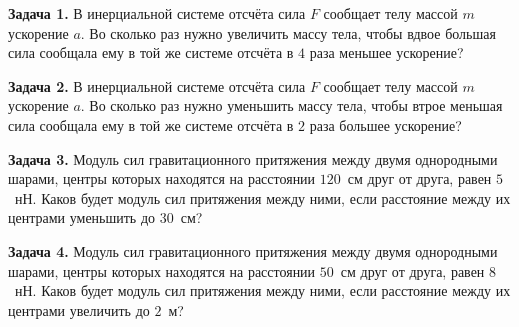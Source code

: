 
\begin{taskbasic}[code={\label{task:dem26_v1_n2}}]
\textbf{Задача 1.} В инерциальной системе отсчёта сила $F$ сообщает телу массой $m$ ускорение $a$. Во сколько раз нужно увеличить массу тела, чтобы вдвое большая сила сообщала ему в той же системе отсчёта в $4$ раза меньшее ускорение?

\end{taskbasic}

\begin{taskbasic}[code={\label{task:dem26_v2_n2}}]
\textbf{Задача 2.} В инерциальной системе отсчёта сила $F$ сообщает телу массой $m$ ускорение $a$. Во сколько раз нужно уменьшить массу тела, чтобы втрое меньшая сила сообщала ему в той же системе отсчёта в $2$ раза большее ускорение?

\end{taskbasic}

\begin{taskbasic}[code={\label{task:dem26_v3_n2}}]
\textbf{Задача 3.} Модуль сил гравитационного притяжения между двумя однородными шарами, центры которых находятся на расстоянии $120$~см друг от друга, равен $5$~нН. Каков будет модуль сил притяжения между ними, если расстояние между их центрами уменьшить до $30$~см?

\end{taskbasic}

\begin{taskbasic}[code={\label{task:dem26_v4_n2}}]
\textbf{Задача 4.} Модуль сил гравитационного притяжения между двумя однородными шарами, центры которых находятся на расстоянии $50$~см друг от друга, равен $8$~нН. Каков будет модуль сил притяжения между ними, если расстояние между их центрами увеличить до $2$~м?

\end{taskbasic}

